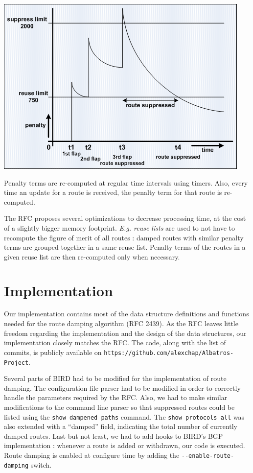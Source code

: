 \documentclass[a4paper,english]{IEEEtran}
\begin{document}
\begin{center}
\includegraphics[scale=0.5]{route_damping} 
\par\end{center}

Penalty terms are re-computed at regular time intervals using timers.
Also, every time an update for a route is received, the penalty term
for that route is re-computed.

The RFC proposes several optimizations to decrease processing time,
at the cost of a slightly bigger memory footprint. \textit{E.g. reuse
lists} are used to not have to recompute the figure of merit of all
routes : damped routes with similar penalty terms are grouped together
in a same reuse list. Penalty terms of the routes in a given reuse
list are then re-computed only when necessary.


\section{Implementation}

Our implementation contains most of the data structure definitions
and functions needed for the route damping algorithm (RFC 2439).
As the RFC leaves little freedom regarding the implementation and the 
design of the data structures, our implementation closely matches the RFC.
The code, along with the list of commits, is publicly available on
{\tt\small https://github.com/alexchap/Albatros-Project}.

Several parts of BIRD had to be modified for the implementation of route damping.
The configuration file parser had to be modified in order to correctly handle the parameters
required by the RFC.
Also, we had to make similar modifications to the command line parser so that suppressed routes
could be listed using the \texttt{\small show dampened paths} command.
The \texttt{\small show protocols all} was also extended with a ``damped'' field, indicating the total number of currently damped routes.
Last but not least, we had to add hooks to BIRD's BGP implementation : whenever a route is added or withdrawn, our code is executed.
Route damping is enabled at configure time by adding the {\tt\small -{}-enable-route-damping}
switch.
\end{document}
